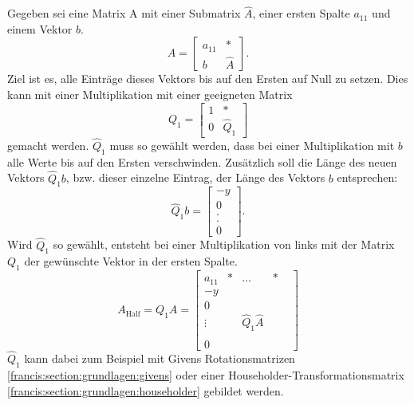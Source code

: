 Gegeben sei eine Matrix A mit einer Submatrix $\hat{A}$, einer ersten Spalte $a_{11}$ und einem Vektor $b$.
\begin{equation}
A=
\begin{bmatrix}
a_{11} & *\\
b & \hat{A}
\end{bmatrix}.
\end{equation}
Ziel ist es, alle Einträge dieses Vektors bis auf den Ersten auf Null zu setzen.
Dies kann mit einer Multiplikation mit einer geeigneten Matrix
\begin{equation}
Q_{1}=
\begin{bmatrix}
	1 & *\\
	0 & \hat{Q}_1
\end{bmatrix}
\end{equation}
gemacht werden.
$\hat{Q}_1$ muss so gewählt werden, dass bei einer Multiplikation mit $b$ alle Werte bis auf den Ersten verschwinden.
Zusätzlich soll die Länge des neuen Vektors $\hat{Q}_1b$, bzw. dieser einzelne Eintrag, der Länge des Vektors $b$ entsprechen:
\begin{equation}
\hat{Q}_1b=
\begin{bmatrix}
-y\\
0\\
.\\
.\\
0
\end{bmatrix}.
\end{equation}
Wird $\hat{Q}_1$ so gewählt, entsteht bei einer Multiplikation von links mit der Matrix $Q_1$ der gewünschte Vektor in der ersten Spalte.
\begin{equation}
A_{\text{Half}}=Q_{1}A=
\begin{bmatrix}
a_{11} & * & \dots & *\\
-y & \\
0 & & & &\\
\vdots & &\hat{Q}_1\hat{A} & &\\
 & & & &\\
0 & & & &
\end{bmatrix}
\end{equation}
$\hat{Q}_1$ kann dabei zum Beispiel mit Givens Rotationsmatrizen \ref{francis:section:grundlagen:givens} oder einer Householder-Trans\-for\-ma\-tions\-ma\-trix \ref{francis:section:grundlagen:householder} gebildet werden.

